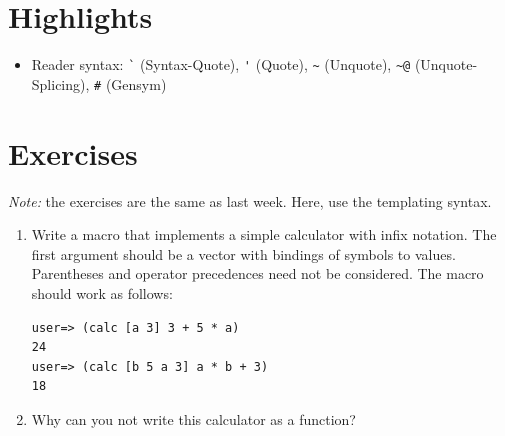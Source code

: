 \documentclass[11pt,a4paper]{article}
\begin{document}
\section{Highlights}

\begin{itemize}
    \item Reader syntax: \verb|`| (Syntax-Quote), \verb|'| (Quote), \verb|~| (Unquote), \verb|~@| (Unquote-Splicing), \verb|#| (Gensym)
\end{itemize}



\section{Exercises}

\emph{Note:} the exercises are the same as last week.
Here, use the templating syntax.


\begin{exercise}[Macro]
\begin{enumerate}[label=\alph*)]
\item
Write a macro that implements a simple calculator with infix notation. The first argument should be a vector with bindings of symbols to values. Parentheses and operator precedences need not be considered. The macro should work as follows:
\begin{verbatim}
user=> (calc [a 3] 3 + 5 * a)
24
user=> (calc [b 5 a 3] a * b + 3)
18
\end{verbatim}
\item Why can you not write this calculator as a function?
\end{enumerate}
\end{exercise}
\end{document}
